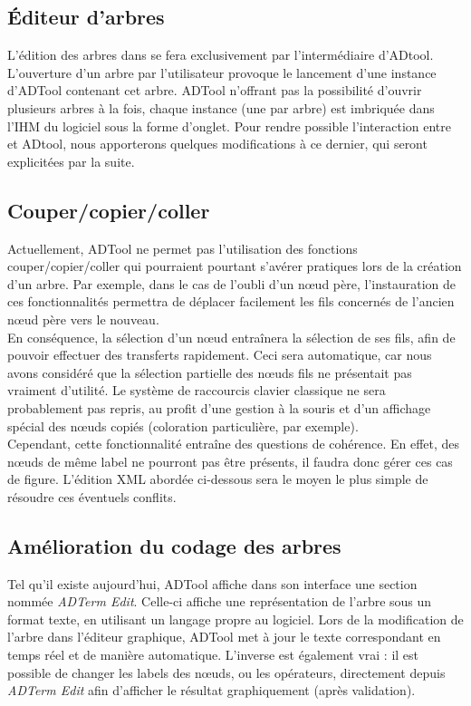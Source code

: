 	\subsection{Éditeur d'arbres} %
		L'édition des arbres dans \glasir se fera exclusivement par l'intermédiaire d'ADtool. L'ouverture d'un arbre par l'utilisateur provoque le lancement d'une instance d'ADTool contenant cet arbre. ADTool n'offrant pas la possibilité d'ouvrir plusieurs arbres à la fois, chaque instance (une par arbre) est imbriquée dans l'IHM du logiciel sous la forme d'onglet. Pour rendre possible l'interaction entre \glasir et ADtool, nous apporterons quelques modifications à ce dernier, qui seront explicitées par la suite. %

	\subsection{Couper/copier/coller}	
		Actuellement, ADTool ne permet pas l'utilisation des fonctions couper/copier/coller qui pourraient pourtant s'avérer pratiques lors de la création d'un arbre. Par exemple, dans le cas de l'oubli d'un nœud père, l'instauration de ces fonctionnalités permettra de déplacer facilement les fils concernés de l'ancien nœud père vers le nouveau.\\
		En conséquence, la sélection d'un nœud entraînera la sélection de ses fils, afin de pouvoir effectuer des transferts rapidement. Ceci sera automatique, car nous avons considéré que la sélection partielle des nœuds fils ne présentait pas vraiment d'utilité. Le système de raccourcis clavier classique ne sera probablement pas repris, au profit d'une gestion à la souris et d'un affichage spécial des nœuds copiés (coloration particulière, par exemple).\\ %

		Cependant, cette fonctionnalité entraîne des questions de cohérence. En effet, des nœuds de même label ne pourront pas être présents, il faudra donc gérer ces cas de figure. L'édition XML abordée ci-dessous sera le moyen le plus simple de résoudre ces éventuels conflits. %

	\subsection{Amélioration du codage des arbres}
		Tel qu'il existe aujourd'hui, ADTool affiche dans son interface une section nommée \emph{ADTerm Edit}. Celle-ci affiche une représentation de l'arbre sous un format texte, en utilisant un langage propre au logiciel. Lors de la modification de l'arbre dans l'éditeur graphique, ADTool met à jour le texte correspondant en temps réel et de manière automatique. L'inverse est également vrai : il est possible de changer les labels des nœuds, ou les opérateurs, directement depuis \emph{ADTerm Edit} afin d'afficher le résultat graphiquement (après validation).\\ 

